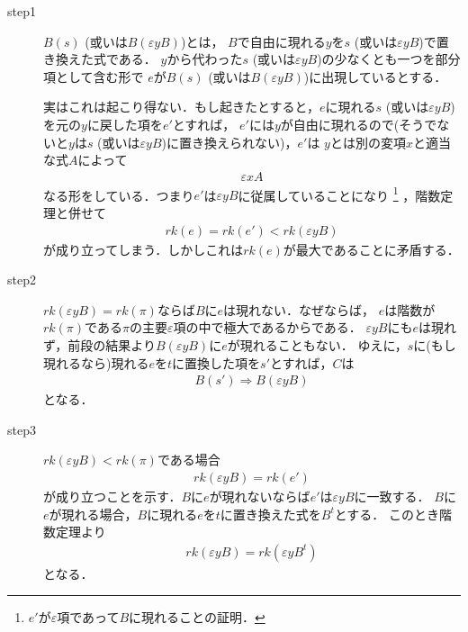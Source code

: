 	\begin{metaprf}\mbox{}
		\begin{description}
			\item[step1]
				$B(s)$ (或いは$B(\varepsilon y B)$)とは，
				$B$で自由に現れる$y$を$s$ (或いは$\varepsilon y B$)で置き換えた式である．
				$y$から代わった$s$ (或いは$\varepsilon y B$)の少なくとも一つを部分項として含む形で
				$e$が$B(s)$ (或いは$B(\varepsilon y B)$)に出現しているとする．
				
				実はこれは起こり得ない．もし起きたとすると，$e$に現れる$s$ (或いは$\varepsilon y B$)
				を元の$y$に戻した項を$e'$とすれば，
				$e'$には$y$が自由に現れるので(そうでないと$y$は$s$
				(或いは$\varepsilon y B$)に置き換えられない)，$e'$は
				$y$とは別の変項$x$と適当な式$A$によって
				\begin{align}
					\varepsilon x A
				\end{align}
				なる形をしている．つまり$e'$は$\varepsilon y B$に従属していることになり
				\footnote{
					$e'$が$\varepsilon$項であって$B$に現れることの証明．
				}
				，階数定理と併せて
				\begin{align}
					rk(e) = rk(e') < rk(\varepsilon y B)
				\end{align}
				が成り立ってしまう．しかしこれは$rk(e)$が最大であることに矛盾する．
				
			\item[step2] $rk(\varepsilon y B) = rk(\pi)$ならば$B$に$e$は現れない．なぜならば，
				$e$は階数が$rk(\pi)$である$\pi$の主要$\varepsilon$項の中で極大であるからである．
				$\varepsilon y B$にも$e$は現れず，前段の結果より$B(\varepsilon y B)$に$e$が現れることもない．
				ゆえに，$s$に(もし現れるなら)現れる$e$を$t$に置換した項を$s'$とすれば，$C$は
				\begin{align}
					B(s') \Longrightarrow B(\varepsilon y B)
				\end{align}
				となる．
			
			\item[step3]
				$rk(\varepsilon y B) < rk(\pi)$である場合
				\begin{align}
					rk(\varepsilon y B) = rk(e')
				\end{align}
				が成り立つことを示す．$B$に$e$が現れないならば$e'$は$\varepsilon y B$に一致する．
				$B$に$e$が現れる場合，$B$に現れる$e$を$t$に置き換えた式を$B^{t}$とする．
				このとき階数定理より
				\begin{align}
					rk(\varepsilon y B) = rk(\varepsilon y B^{t})
				\end{align}
				となる．
				\QED
		\end{description}
	\end{metaprf}
	
